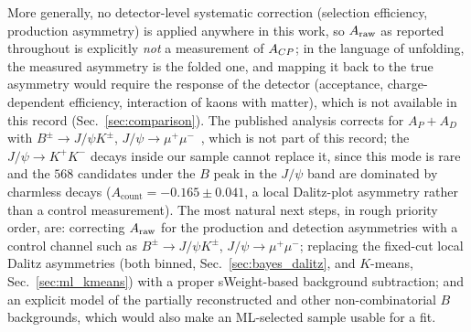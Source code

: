 More generally, no detector-level systematic correction (selection efficiency, production asymmetry) is applied anywhere in this work, so $A_{\mathrm{raw}}$ as reported throughout is explicitly \emph{not} a measurement of $A_{CP}$; in the language of unfolding, the measured asymmetry is the folded one, and mapping it back to the true asymmetry would require the response of the detector (acceptance, charge-dependent efficiency, interaction of kaons with matter), which is not available in this record (Sec.~\ref{sec:comparison}). The published analysis corrects for $A_P+A_D$ with $B^\pm\to J/\psi K^\pm$, $J/\psi\to\mu^+\mu^-$~\cite{lhcb_cpv_prd2023}, which is not part of this record; the $J/\psi\to K^+K^-$ decays inside our sample cannot replace it, since this mode is rare and the $568$ candidates under the $B$ peak in the $J/\psi$ band are dominated by charmless decays ($A_{\mathrm{count}}=-0.165\pm0.041$, a local Dalitz-plot asymmetry rather than a control measurement).
The most natural next steps, in rough priority order, are: correcting $A_{\mathrm{raw}}$ for the production and detection asymmetries with a control channel such as $B^\pm\to J/\psi K^\pm$, $J/\psi\to\mu^+\mu^-$; replacing the fixed-cut local Dalitz asymmetries (both binned, Sec.~\ref{sec:bayes_dalitz}, and $K$-means, Sec.~\ref{sec:ml_kmeans}) with a proper sWeight-based background subtraction; and an explicit model of the partially reconstructed and other non-combinatorial $B$ backgrounds, which would also make an ML-selected sample usable for a fit.
\FloatBarrier
